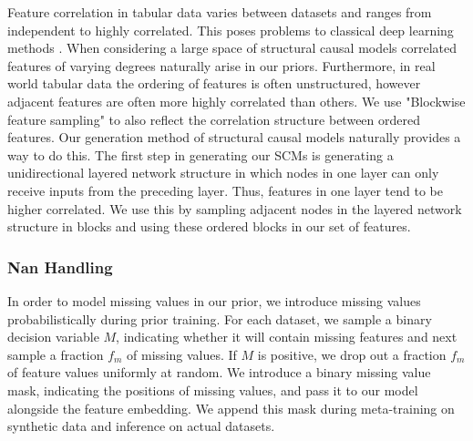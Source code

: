 \documentclass{article}
\begin{document}
Feature correlation in tabular data varies between datasets and ranges from independent to highly correlated. This poses problems to classical deep learning methods \citep{nnsfortabular}.
When considering a large space of structural causal models correlated features of varying degrees naturally arise in our priors.
Furthermore, in real world tabular data the ordering of features is often unstructured, however adjacent features are often more highly correlated than others. We use "Blockwise feature sampling" to also reflect the correlation structure between ordered features. Our generation method of structural causal models naturally provides a way to do this. The first step in generating our SCMs is generating a unidirectional layered network structure in which nodes in one layer can only receive inputs from the preceding layer. Thus, features in one layer tend to be higher correlated. We use this by sampling adjacent nodes in the layered network structure in blocks and using these ordered blocks in our set of features.

\subsubsection{Nan Handling}
In order to model missing values in our prior, we introduce missing values probabilistically during prior training. For each dataset, we sample a binary decision variable $M$, indicating whether it will contain missing features and next sample a fraction $f_m$ of missing values. If $M$ is positive, we drop out a fraction $f_m$ of feature values uniformly at random.
We introduce a binary missing value mask, indicating the positions of missing values, and pass it to our model alongside the feature embedding. We append this mask during meta-training on synthetic data and inference on actual datasets.
\end{document}
